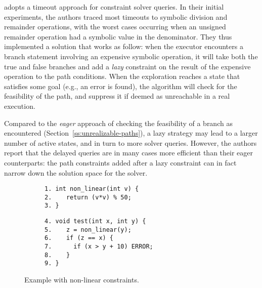 
\cite{UCKLEE-USEC15} adopts a timeout approach for constraint solver queries. In their initial experiments, the authors traced most timeouts to symbolic division and remainder operations, with the worst cases occurring when an unsigned remainder operation had a symbolic value in the denominator.
They thus implemented a solution that works as follow: when the executor encounters a branch statement involving an expensive symbolic operation, it will take both the true and false branches and add a {\em lazy} constraint on the result of the expensive operation to the path conditions. When the exploration reaches a state that satisfies some goal (e.g., an error is found), the algorithm will check for the feasibility of the path, and suppress it if deemed as unreachable in a real execution.

Compared to the {\em eager} approach of checking the feasibility of a branch as encountered (Section~\ref{ss:unrealizable-paths}), a lazy strategy may lead to a larger number of active states, and in turn to more solver queries. However, the authors report that the delayed queries are in many cases more efficient than their eager counterparts: the path constraints added after a lazy constraint can in fact narrow down the solution space for the solver.

\begin{figure}[t]
  \begin{center}
  \begin{subfigure}{.4\textwidth}
    \vspace{0mm}
    \begin{lstlisting}[basicstyle=\ttfamily\scriptsize]
1. int non_linear(int v) {
2.    return (v*v) % 50;
3. }
    \end{lstlisting}
    \vspace{8.5mm}
  \end{subfigure}%
    \begin{subfigure}{.4\textwidth}
    \begin{lstlisting}[basicstyle=\ttfamily\scriptsize]
4. void test(int x, int y) {
5.    z = non_linear(y);
6.    if (z == x) {
7.      if (x > y + 10) ERROR;  
8.    }
9. }
    \end{lstlisting}
  \end{subfigure}%
  \end{center}
  \vspace{-3.5mm}
  \caption{Example with non-linear constraints.}
  \label{fi:non-linear-constraints}
\end{figure}


